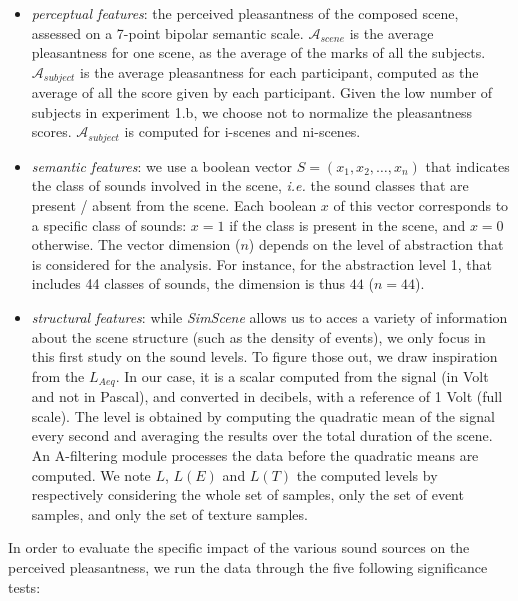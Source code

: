 \documentclass[12pt]{elsarticle}
\begin{document}
\begin{itemize}
\item \emph{perceptual features}: the perceived pleasantness of the composed scene, assessed on a 7-point bipolar semantic scale. $\mathcal{A}_{scene}$ is the average pleasantness for one scene, as the average of the marks of all the subjects. $\mathcal{A}_{subject}$ is the average pleasantness for each participant, computed as the average of all the score given by each participant. Given the low number of subjects in experiment 1.b, we choose not to normalize the pleasantness scores. $\mathcal{A}_{subject}$ is computed for i-scenes and ni-scenes.

\item \emph{semantic features}: we use a boolean vector $S = (x_1, x_2, \ldots, x_n)$ that indicates the class of sounds involved in the scene, \textit{i.e.} the sound classes that are present / absent from the scene. Each boolean $x$ of this vector corresponds to a specific class of sounds: $x = 1$ if the class is present in the scene, and $x = 0$ otherwise. The vector dimension ($n$) depends on the level of abstraction that is considered for the analysis. For instance, for the abstraction level 1, that includes 44 classes of sounds, the dimension is thus $44$ ($n = 44$).

\item \emph{structural features}: while \emph{SimScene} allows us to acces a variety of information about the scene structure (such as the density of events), we only focus in this first study on the sound levels. To figure those out, we draw inspiration from the $L_{Aeq}$. In our case, it is a scalar computed from the  signal (in Volt and not in Pascal), and converted in decibels, with a reference of 1 Volt (full scale). The level is obtained by computing the quadratic mean of the signal every second and averaging the results over the total duration of the scene. An A-filtering module processes the data before the quadratic means are computed. We note $L$, $L(E)$ and $L(T)$ the computed levels by respectively considering the whole set of samples, only the set of event samples, and only the set of texture samples.
\end{itemize}


In order to evaluate the specific impact of the various sound sources on the perceived pleasantness, we run the data through the five following significance tests:
\end{document}
